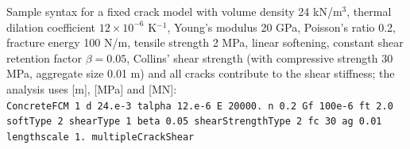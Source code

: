 \documentclass[a4paper]{article}
\begin{document}
Sample syntax for a fixed crack model with volume density 24 kN/m$^3$, thermal dilation coefficient $12\times10^{-6}$ K$^{-1}$, Young's modulus 20 GPa, Poisson's ratio 0.2, fracture energy 100 N/m, tensile strength 2 MPa, linear softening, constant shear retention factor $\beta = 0.05$, Collins' shear strength (with compressive strength 30 MPa, aggregate size 0.01 m) and all cracks contribute to the shear stiffness; the analysis uses [m], [MPa] and [MN]:\\
\texttt{ConcreteFCM 1 d 24.e-3 talpha 12.e-6 E 20000.~n 0.2 Gf 100e-6 ft 2.0 softType 2 shearType 1 beta 0.05 shearStrengthType 2 fc 30 ag 0.01\\ lengthscale 1.~multipleCrackShear}

\end{document}
